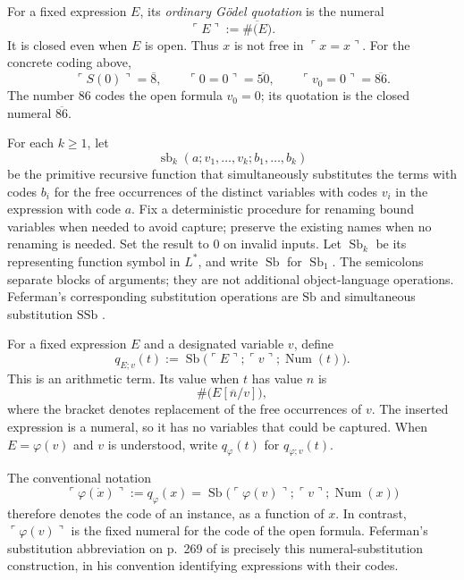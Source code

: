 \documentclass[11pt]{article}
\newcommand{\Num}{\operatorname{Num}}
\newcommand{\sbop}{\operatorname{sb}}
\newcommand{\Sb}{\operatorname{Sb}}
\newcommand{\code}[1]{\#\bigl(#1\bigr)}
\newcommand{\quo}[1]{\ulcorner #1\urcorner}
\newcommand{\bn}[1]{\overline{#1}}
\newcommand{\defeq}{\mathrel{:=}}
\theoremstyle{definition}
\begin{document}
For a fixed expression $E$, its \emph{ordinary G\"odel quotation} is
the numeral
\begin{equation}\label{eq:quote}
  \quo E\defeq\bn{\code E}.
\end{equation}
It is closed even when $E$ is open. Thus $x$ is not free in
$\quo{x=x}$.
For the concrete coding above,
\[
 \quo{S(0)}=\bn8,\qquad
 \quo{0=0}=\bn{50},\qquad
 \quo{v_0=0}=\bn{86}.
\]
The number $86$ codes the open formula $v_0=0$; its quotation is the
closed numeral $\bn{86}$.

For each $k\geq1$, let
\[
 \sbop_k(a;v_1,\ldots,v_k;b_1,\ldots,b_k)
\]
be the primitive recursive function that simultaneously substitutes
the terms with codes $b_i$ for the free occurrences of the distinct
variables with codes $v_i$ in the expression with code $a$.
Fix a deterministic procedure for renaming bound variables when needed
to avoid capture; preserve the existing names when no renaming is
needed. Set the result to $0$ on invalid inputs. Let $\Sb_k$ be its
representing function symbol in $L^{*}$, and write $\Sb$ for $\Sb_1$.
The semicolons separate blocks of arguments; they are not additional
object-language operations. Feferman's corresponding substitution
operations are $\mathrm{Sb}$ and simultaneous substitution
$\mathrm{SSb}$ \cite[\S2(b), pp.~42--43; \S4, p.~57]{F60}.

For a fixed expression $E$ and a designated variable $v$, define
\begin{equation}\label{eq:q}
 q_{E;v}(t)\defeq
 \Sb\bigl(\quo E;\quo v;\Num(t)\bigr).
\end{equation}
This is an arithmetic term. Its value when $t$ has value $n$ is
\[
 \code{E[\bn n/v]},
\]
where the bracket denotes replacement of the free occurrences of $v$.
The inserted expression is a numeral, so it has no variables that could
be captured. When $E=\varphi(v)$ and $v$ is understood, write
$q_\varphi(t)$ for $q_{\varphi;v}(t)$.

The conventional notation
\begin{equation}\label{eq:dotted-quotation}
 \quo{\varphi(\dot x)}\defeq q_\varphi(x)
   =\Sb\bigl(\quo{\varphi(v)};\quo v;\Num(x)\bigr)
\end{equation}
therefore denotes the code of an instance, as a function of $x$.
In contrast, $\quo{\varphi(v)}$ is the fixed numeral for the code of
the open formula. Feferman's substitution abbreviation on p.~269 of
\cite{F62} is precisely this numeral-substitution construction,
in his convention identifying expressions with their codes.
\end{document}
